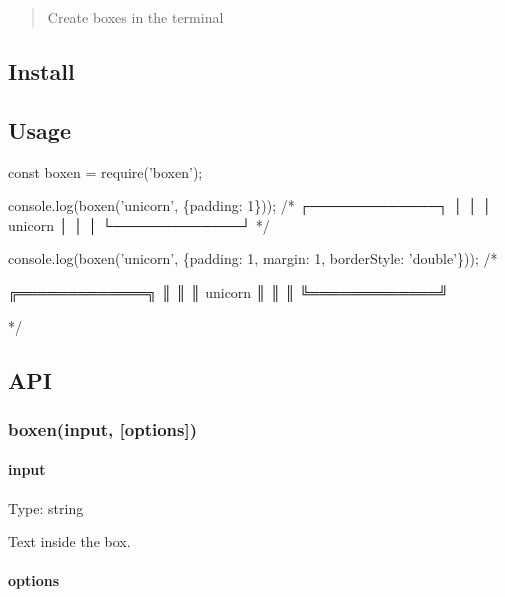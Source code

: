 \begin{quote}
Create boxes in the terminal \end{quote}


\href{https://travis-ci.org/sindresorhus/boxen}{\tt }

\subsection*{Install}




\subsection*{Usage}


\begin{DoxyCode}
const boxen = require('boxen');

console.log(boxen('unicorn', \{padding: 1\}));
/*
┌─────────────┐
│             │
│   unicorn   │
│             │
└─────────────┘
*/

console.log(boxen('unicorn', \{padding: 1, margin: 1, borderStyle: 'double'\}));
/*

   ╔═════════════╗
   ║             ║
   ║   unicorn   ║
   ║             ║
   ╚═════════════╝

*/
\end{DoxyCode}


\subsection*{A\+PI}

\subsubsection*{boxen(input, \mbox{[}options\mbox{]})}

\paragraph*{input}

Type\+: {\ttfamily string}

Text inside the box.

\paragraph*{options}

